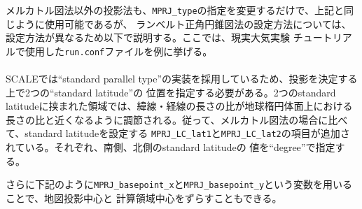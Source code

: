 メルカトル図法以外の投影法も、\verb|MPRJ_type|の指定を変更するだけで、上記と同じように使用可能であるが、
ランベルト正角円錐図法の設定方法については、設定方法が異なるため以下で説明する。ここでは、現実大気実験
チュートリアルで使用した\verb|run.conf|ファイルを例に挙げる。\\

\\

SCALEでは``standard parallel type''の実装を採用しているため、投影を決定する上で2つの``standard latitude''の
位置を指定する必要がある。2つのstandard latitudeに挟まれた領域では、緯線・経線の長さの比が地球楕円体面上における
長さの比と近くなるように調節される。従って、メルカトル図法の場合に比べて、standard latitudeを設定する
\verb|MPRJ_LC_lat1|と\verb|MPRJ_LC_lat2|の項目が追加されている。それぞれ、南側、北側のstandard latitudeの
値を``degree''で指定する。

さらに下記のように\verb|MPRJ_basepoint_x|と\verb|MPRJ_basepoint_y|という変数を用いることで、地図投影中心と
計算領域中心をずらすこともできる。\\

\\

